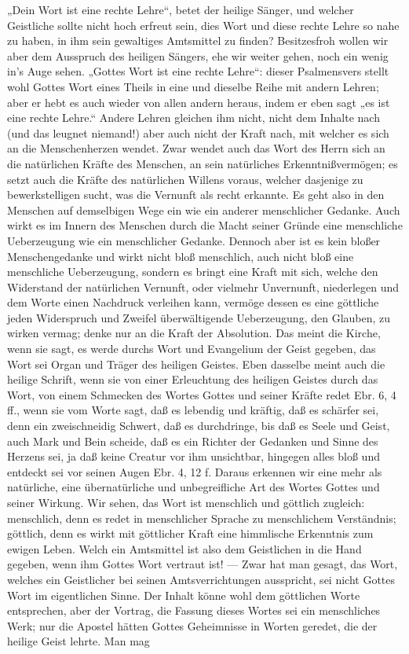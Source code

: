 „Dein Wort ist eine rechte Lehre“, betet der heilige Sänger, und welcher Geistliche sollte nicht hoch erfreut sein, dies Wort und diese rechte Lehre so nahe zu haben, in ihm sein gewaltiges Amtsmittel zu finden? Besitzesfroh wollen wir aber dem Ausspruch des heiligen Sängers, ehe wir weiter gehen, noch ein wenig in’s Auge sehen. „Gottes Wort ist eine rechte Lehre“: dieser Psalmensvers stellt wohl Gottes Wort eines Theils in eine und dieselbe Reihe mit andern Lehren; aber er hebt es auch wieder von allen andern heraus, indem er eben sagt „es ist eine rechte Lehre.“ Andere Lehren gleichen ihm nicht, nicht dem Inhalte nach (und das leugnet niemand!) aber auch nicht der Kraft nach, mit welcher es sich an die Menschenherzen wendet. Zwar wendet auch das Wort des Herrn sich an die natürlichen Kräfte des Menschen, an sein natürliches Erkenntnißvermögen; es setzt auch die Kräfte des natürlichen Willens voraus, welcher dasjenige zu bewerkstelligen sucht, was die Vernunft als recht erkannte. Es geht also in den Menschen auf demselbigen Wege ein wie ein anderer menschlicher Gedanke. Auch wirkt es im Innern des Menschen durch die Macht seiner Gründe eine menschliche Ueberzeugung wie ein menschlicher Gedanke. Dennoch aber ist es kein bloßer Menschengedanke und wirkt nicht bloß menschlich, auch nicht bloß eine menschliche Ueberzeugung, sondern es bringt eine Kraft mit sich, welche den Widerstand der natürlichen Vernunft, oder vielmehr Unvernunft, niederlegen und dem Worte einen Nachdruck verleihen kann, vermöge dessen es eine göttliche jeden Widerspruch und Zweifel überwältigende Ueberzeugung, den Glauben, zu
wirken vermag; denke nur an die Kraft der Absolution. Das meint die Kirche, wenn sie sagt, es werde durchs Wort und Evangelium der Geist gegeben, das Wort sei Organ und Träger des heiligen Geistes. Eben dasselbe meint auch die heilige Schrift, wenn sie von einer Erleuchtung des heiligen Geistes durch das Wort, von einem Schmecken des Wortes Gottes und seiner Kräfte redet Ebr. 6, 4 ff., wenn sie vom Worte sagt, daß es lebendig und kräftig, daß es schärfer sei, denn ein zweischneidig Schwert, daß es durchdringe, bis daß es Seele und Geist, auch Mark und Bein scheide, daß es ein Richter der Gedanken und Sinne des Herzens sei, ja daß keine Creatur vor ihm unsichtbar, hingegen alles bloß und entdeckt sei vor seinen Augen Ebr. 4, 12 f. Daraus erkennen wir eine mehr als natürliche, eine übernatürliche und unbegreifliche Art des Wortes Gottes und seiner Wirkung. Wir sehen, das Wort ist menschlich und göttlich zugleich: menschlich, denn es redet in menschlicher Sprache zu menschlichem Verständnis; göttlich, denn es wirkt mit göttlicher Kraft eine himmlische Erkenntnis zum ewigen Leben. Welch ein Amtsmittel ist also dem Geistlichen in die Hand gegeben, wenn ihm Gottes Wort vertraut ist! — Zwar hat man gesagt, das Wort, welches ein Geistlicher bei seinen Amtsverrichtungen ausspricht, sei nicht Gottes Wort im eigentlichen Sinne. Der Inhalt könne wohl dem göttlichen Worte entsprechen, aber der Vortrag, die Fassung dieses Wortes sei ein menschliches Werk; nur die Apostel hätten Gottes Geheimnisse in Worten geredet, die der heilige Geist lehrte. Man mag

